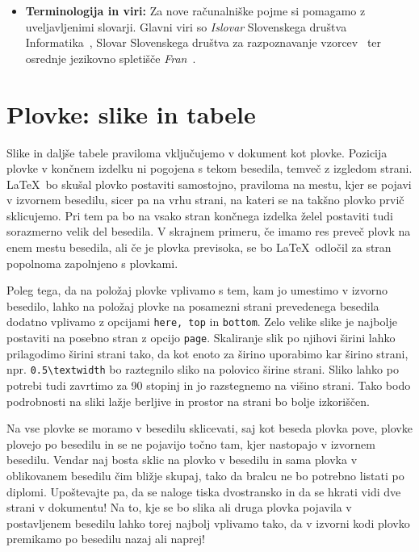 \documentclass[a4paper,12pt,openright]{book}
\begin{document}
\begin{itemize}
    \item \textbf{Terminologija in viri:} Za nove računalniške pojme si pomagamo z uveljavljenimi slovarji. Glavni viri so \textit{Islovar} Slovenskega društva Informatika~\cite{Islovar}, Slovar Slovenskega društva za razpoznavanje vzorcev~\cite{sdrv} ter osrednje jezikovno spletišče \textit{Fran}~\cite{fran}.
\end{itemize}

\chapter{Plovke: slike in tabele}
\label{ch:plovke}

Slike in daljše tabele praviloma vključujemo v dokument kot plovke.
Pozicija plovke v končnem izdelku ni pogojena s tekom besedila, temveč z izgledom strani.
\LaTeX\ bo skušal plovko postaviti samostojno, praviloma na mestu, kjer se pojavi v izvornem besedilu, sicer pa na
vrhu strani, na kateri se na takšno plovko prvič sklicujemo.
Pri tem pa bo na vsako stran končnega izdelka želel postaviti tudi sorazmerno velik del besedila.
V skrajnem primeru, če imamo res preveč plovk na enem mestu besedila, ali če je plovka previsoka, se bo \LaTeX\ odločil za stran popolnoma zapolnjeno s plovkami.

Poleg tega, da na položaj plovke vplivamo s tem, kam jo umestimo v izvorno besedilo, lahko na položaj plovke na posamezni strani prevedenega besedila dodatno vplivamo z opcijami \texttt{here, top} in \texttt{bottom}.
Zelo velike slike je najbolje postaviti na posebno stran z opcijo \texttt{page}.
Skaliranje slik po njihovi širini lahko prilagodimo širini strani tako, da kot enoto za širino uporabimo kar širino strani, npr. \verb=0.5\textwidth= bo raztegnilo sliko na polovico širine strani.
Sliko lahko po potrebi tudi zavrtimo za 90 stopinj in jo razstegnemo na višino strani.
Tako bodo podrobnosti na sliki lažje berljive in prostor na strani bo bolje izkoriščen.

Na vse plovke se moramo v besedilu sklicevati, saj kot beseda plovka pove, plovke plovejo po besedilu in se ne pojavijo točno tam, kjer nastopajo v izvornem besedilu.
Vendar naj bosta  sklic na plovko v besedilu in sama plovka v oblikovanem besedilu čim bližje skupaj, tako da bralcu ne bo potrebno listati po diplomi.
Upoštevajte pa, da se naloge tiska dvostransko in da se hkrati vidi dve strani v dokumentu!
Na to, kje se bo slika ali druga plovka pojavila v postavljenem besedilu lahko torej najbolj vplivamo tako, da v izvorni kodi plovko premikamo po besedilu nazaj ali naprej!
\end{document}
